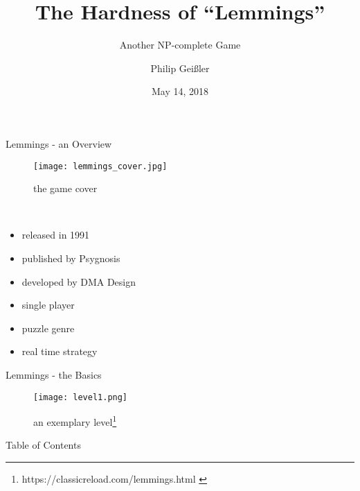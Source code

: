 \documentclass[]{beamer}
\title{The Hardness of ``Lemmings''}
\subtitle{Another NP-complete Game}
\author{Philip Geißler}
\date{May 14, 2018}
\newcommand{\fn}[1]{{\footnote{\scriptsize{ #1 }}}}
\begin{document}
\frame{\titlepage}


\begin{frame}{Lemmings - an Overview}
\begin{minipage}[t]{0.4\textwidth}
	\begin{figure}
		\texttt{[image: lemmings\_cover.jpg]}
		\caption{the game cover\footnotemark}
	\end{figure}
\end{minipage}
\begin{minipage}[t]{0.05\textwidth}
~
\end{minipage}
\begin{minipage}[t]{0.5\textwidth}
\vspace{0.5cm}
\begin{itemize}
\item released in 1991
\item published by Psygnosis
\item developed by DMA Design
\vspace{0.5cm}
\item single player
\item puzzle genre
\item real time strategy
\end{itemize}
\end{minipage}
\end{frame}


\begin{frame}{Lemmings - the Basics}
\begin{figure}
\texttt{[image: level1.png]}
\caption{an exemplary level\fn{https://classicreload.com/lemmings.html}}
\end{figure}
\end{frame}


\begin{frame}{Table of Contents}
\tableofcontents
\end{frame}
\end{document}
